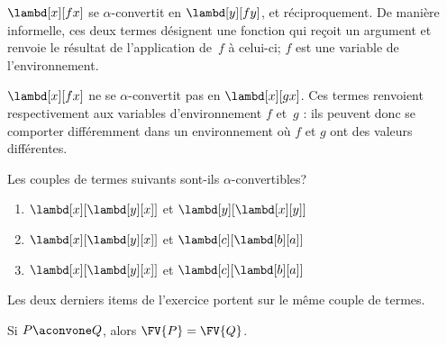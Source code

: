 \documentclass[../../../include/open-logic-section]{subfiles}
\begin{document}
\begin{ex}
$\lambd[x][f x]$ se $\alpha$-convertit en
$\lambd[y][f y]$, et réciproquement. De
manière informelle, ces deux termes désignent
une fonction qui reçoit un argument et renvoie
le résultat de l'application de~$f$ à celui-ci;
$f$ est une variable de l'environnement.

$\lambd[x][f x]$ ne se $\alpha$-convertit pas
en $\lambd[x][g x]$. Ces termes renvoient
respectivement aux variables d'environnement
$f$ et~$g$ : ils peuvent donc se comporter
différemment dans un environnement où
$f$ et $g$ ont des valeurs différentes.
\end{ex}

\begin{prob}
Les couples de termes suivants sont-ils
$\alpha$-convertibles?
\begin{enumerate}
\item $\lambd[x][\lambd[y][x]]$ et
  $\lambd[y][\lambd[x][y]]$
\item $\lambd[x][\lambd[y][x]]$ et
  $\lambd[c][\lambd[b][a]]$
\item $\lambd[x][\lambd[y][x]]$ et
  $\lambd[c][\lambd[b][a]]$
\end{enumerate}
\end{prob}

\begin{explain}
Les deux derniers items de l'exercice portent sur le même
couple de termes.
\end{explain}

\begin{lem}
Si $P \aconvone Q$, alors
$\FV{P} = \FV{Q}$.
\end{lem}
\end{document}
